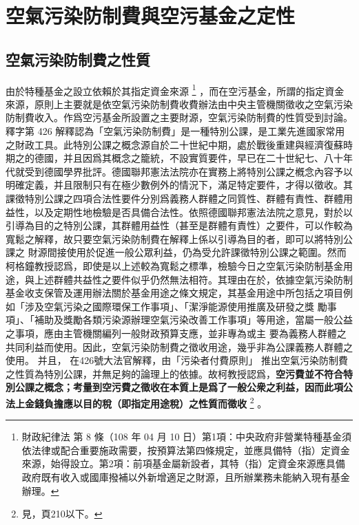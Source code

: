 \documentclass[12pt,a4paper]{article}
\begin{document}

\section{空氣污染防制費與空污基金之定性}

\subsection{空氣污染防制費之性質}
由於特種基金之設立依賴於其指定資金來源
\footnote{財政紀律法 第 8 條（108 年 04 月 10 日）第1項：中央政府非營業特種基金須依法律或配合重要施政需要，按預算法第四條規定，並應具備特（指）定資金來源，始得設立。第2項：前項基金屬新設者，其特（指）定資金來源應具備政府既有收入或國庫撥補以外新增適足之財源，且所辦業務未能納入現有基金辦理。}
，而在空污基金，所謂的指定資金來源，原則上主要就是依空氣污染防制費收費辦法由中央主管機關徵收之空氣污染防制費收入。作爲空污基金所設置之主要財源，空氣污染防制費的性質受到討論。釋字第 426 解釋認為「空氣污染防制費」是一種特別公課，是工業先進國家常用之財政工具。此特別公課之概念源自於二十世紀中期，處於戰後重建與經濟復蘇時期之的德國，并且因爲其概念之籠統，不設實質要件，早已在二十世紀七、八十年代就受到德國學界批評。德國聯邦憲法法院亦在實務上將特別公課之槪念內容予以明確定義，并且限制只有在極少數例外的情況下，滿足特定要件，才得以徵收。其課徵特別公課之四項合法性要件分別爲義務人群體之同質性、群體有責性、群體用益性，以及定期性地檢驗是否具備合法性。依照德國聯邦憲法法院之意見，對於以引導為目的之特別公課，其群體用益性（甚至是群體有責性）之要件，可以作較為 寬鬆之解釋，故只要空氣污染防制費在解釋上係以引導為目的者，即可以將特別公課之 財源間接使用於促進一般公眾利益，仍為受允許課徵特別公課之範圍。然而柯格鐘教授認爲，即使是以上述較為寬鬆之標準，檢驗今日之空氣污染防制基金用途，與上述群體共益性之要件似乎仍然無法相符。其理由在於，依據空氣污染防制基金收支保管及運用辦法關於基金用途之條文規定，其基金用途中所包括之項目例如「涉及空氣污染之國際環保工作事項」、「潔淨能源使用推廣及研發之獎 勵事項」、「補助及獎勵各類污染源辦理空氣污染改善工作事項」等用途，當屬一般公益之事項，應由主管機關編列一般財政預算支應，並非專為或主 要為義務人群體之共同利益而使用。因此，空氣污染防制費之徵收用途，幾乎非為公課義務人群體之使用。
并且，
在426號大法官解釋，由「污染者付費原則」 推出空氣污染防制費之性質為特別公課，并無足夠的論理上的依據。故柯教授認爲，\textbf{空污費並不符合特別公課之概念；考量到空污費之徵收在本質上是爲了一般公衆之利益，因而此項公法上金錢負擔應以目的稅（即指定用途稅）之性質而徵收}
\footnote{見，頁210以下。}
。
\end{document}

